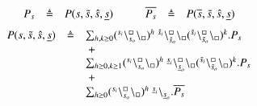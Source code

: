 \[
\begin{array}{lcl@{\hskip 1cm}lcl}
 P_s &\defeq & P(s,\tilde{s},\hat{s},\underline{s}) 
 &
 \overline{P_s}& \defeq & P(\overline{s},\tilde{s},\hat{s},\underline{s})
\end{array}
\]
%
\[
\begin{array}{rcl}
 P(s,\tilde{s},\hat{s},\underline{s}) & \defeq &\sum_{h,k\geq 0}  
  (\startchain{s_i}\chainedlink{s_o}{\noact}\chainend{\noact})^h \ \startchain{\hat{s}_i}\chainedlink{\hat{s}_o}{\noact}\chainend{\noact} (\startchain{\tilde{s}_i}\chainedlink{\tilde{s}_o}{\noact}\chainend{\noact})^k.P_s\\
&&\ + \\
&&
\sum_{h\geq 0,k\geq 1}
 (\startchain{s_i}\chainedlink{s_o}{\noact}\chainend{\noact})^h \ \startchain{\underline{s}_i}\chainedlink{\underline{s}_o}{\noact}\chainend{\noact}(\startchain{\tilde{s}_i}\chainedlink{\tilde{s}_o}{\noact}\chainend{\noact})^k.P_s\\
&&\ +\\
&&\sum_{h\geq 0}(\startchain{s_i}\chainedlink{s_o}{\noact}\chainend{\noact})^h \ \link{\underline{s}_i}{\underline{s}_o}.\overline{P_s}
\end{array}
\]
